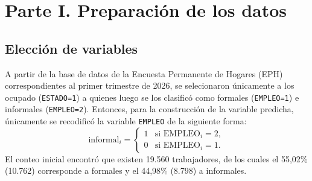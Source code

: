 \section{Parte I. Preparación de los datos}
\label{sec:parte_01}

\subsection{Elección de variables}
A partir de la base de datos de la Encuesta Permanente de Hogares (EPH) correspondientes al primer trimestre de 2026, se selecionaron únicamente a los ocupado (\texttt{ESTADO=1}) a quienes luego se los clasificó como formales (\texttt{EMPLEO=1}) e informales (\texttt{EMPLEO=2}). Entonces, para la construcción de la variable predicha, únicamente se recodificó la variable \texttt{EMPLEO} de la siguiente forma:
\begin{equation}
\mathrm{informal}_i =
\left\{\begin{array}{ll}
1 & \mbox{si } \mathrm{EMPLEO}_i=2,\\
0 & \mbox{si } \mathrm{EMPLEO}_i=1.
\end{array}\right.
\label{eq:informal_parte01}
\end{equation}
El conteo inicial encontró que existen 19.560 trabajadores, de los cuales el 55,02\% (10.762) corresponde a formales y el 44,98\% (8.798) a informales. 

